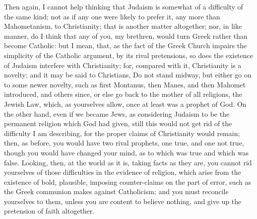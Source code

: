 Then again, I cannot help thinking that Judaism is somewhat of a
difficulty of the same kind; not as if any one were likely to prefer
it, any more than Mahometanism, to Christianity; that is another
matter altogether; nor, in like manner, do I think that any of you, my
brethren, would turn Greek rather than become Catholic: but I mean,
that, as the fact of the Greek Church impairs the simplicity of the
Catholic argument, by its rival pretensions, so does the existence of
Judaism interfere with Christianity; for, compared with it,
Christianity is a novelty; and it may be said to Christians, Do not
stand midway, but either go on to some newer novelty, such as first
Montanus, then Manes, and then Mahomet introduced, and others since,
or else go back to the mother of all religions, the Jewish Law, which,
as yourselves allow, once at least was a prophet of God. On the other
hand, even if we became Jews, as considering Judaism to be the
permanent religion which God had given, still this would not get rid
of the difficulty I am describing, for the proper claims of
Christianity would remain; then, as before, you would have two rival
prophets, one true, and one not true, though you would have changed
your mind, as to which was true and which was false. Looking, then, at
the world as it is, taking facts as they are, you cannot rid
yourselves of those difficulties in the evidence of religion, which
arise from the existence of bold, plausible, imposing counter-claims
on the part of error, such as the Greek communion makes against
Catholicism; and you must reconcile yourselves to them, unless you are
content to believe nothing, and give up the pretension of faith
altogether.

